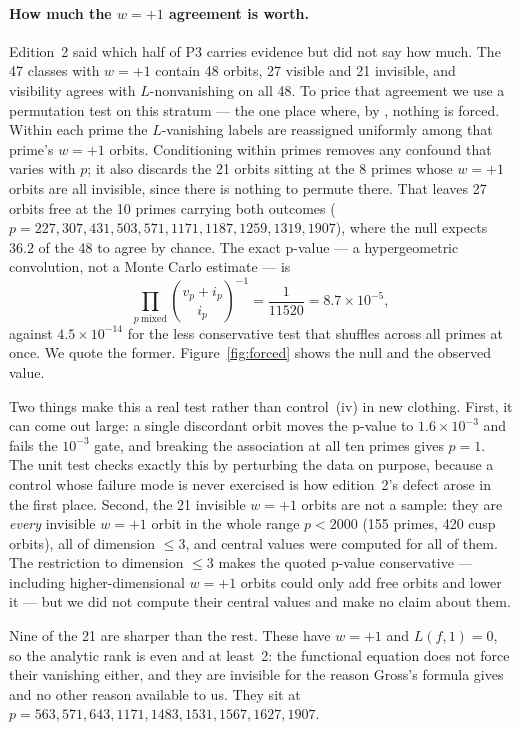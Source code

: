 \documentclass[11pt,a4paper]{article}
\theoremstyle{definition}
\newcommand{\lean}[1]{\path{#1}}
\begin{document}
\paragraph{How much the $w=+1$ agreement is worth.}\label{sec:wplus}
Edition~2 said which half of P3 carries evidence but did not say how much. The 47 classes with $w=+1$ contain 48 orbits, 27 visible and 21 invisible, and visibility agrees with $L$-nonvanishing on all 48. To price that agreement we use a permutation test on this stratum --- the one place where, by \lean{frobenius_forces_nothing_at_w_one}, nothing is forced. Within each prime the $L$-vanishing labels are reassigned uniformly among that prime's $w=+1$ orbits. Conditioning within primes removes any confound that varies with $p$; it also discards the 21 orbits sitting at the 8 primes whose $w=+1$ orbits are all invisible, since there is nothing to permute there. That leaves 27 orbits free at the 10 primes carrying both outcomes ($p=227,307,431,503,571,1171,1187,1259,1319,1907$), where the null expects $36.2$ of the 48 to agree by chance. The exact p-value --- a hypergeometric convolution, not a Monte Carlo estimate --- is
\[
  \prod_{p\ \text{mixed}}\binom{v_p+i_p}{i_p}^{-1}=\frac1{11520}=8.7\times10^{-5},
\]
against $4.5\times10^{-14}$ for the less conservative test that shuffles across all primes at once. We quote the former. Figure~\ref{fig:forced} shows the null and the observed value.

Two things make this a real test rather than control~(iv) in new clothing. First, it can come out large: a single discordant orbit moves the p-value to $1.6\times10^{-3}$ and fails the $10^{-3}$ gate, and breaking the association at all ten primes gives $p=1$. The unit test  checks exactly this by perturbing the data on purpose, because a control whose failure mode is never exercised is how edition~2's defect arose in the first place. Second, the 21 invisible $w=+1$ orbits are not a sample: they are \emph{every} invisible $w=+1$ orbit in the whole range $p<2000$ (155 primes, 420 cusp orbits), all of dimension $\le3$, and central values were computed for all of them. The restriction to dimension $\le3$ makes the quoted p-value conservative --- including higher-dimensional $w=+1$ orbits could only add free orbits and lower it --- but we did not compute their central values and make no claim about them.

Nine of the 21 are sharper than the rest. These have $w=+1$ and $L(f,1)=0$, so the analytic rank is even and at least~2: the functional equation does not force their vanishing either, and they are invisible for the reason Gross's formula gives and no other reason available to us. They sit at $p=563,571,643,1171,1483,1531,1567,1627,1907$.
\end{document}

